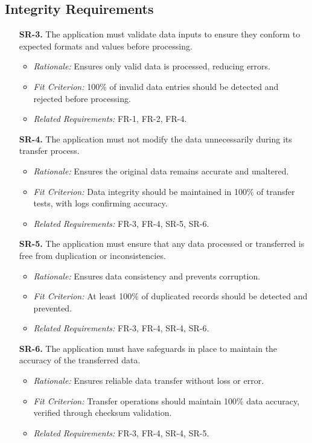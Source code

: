 \documentclass[12pt]{article}
\begin{document}
\subsection{Integrity Requirements}
\begin{enumerate}
  \item[\textbf{SR-3.}] The application must validate data inputs to ensure they 
  conform to expected formats and values before processing.
  \begin{itemize}
    \item \textit{Rationale:} Ensures only valid data is processed, reducing 
    errors.
    \item \textit{Fit Criterion:} 100\% of invalid data entries should 
    be detected and rejected before processing.
    \item \textit{Related Requirements:} FR-1, FR-2, FR-4.
  \end{itemize}

  \item[\textbf{SR-4.}] The application must not modify the data unnecessarily 
  during its transfer process.
  \begin{itemize}
    \item \textit{Rationale:} Ensures the original data remains accurate and 
    unaltered.
    \item \textit{Fit Criterion:} Data integrity should be maintained in 100\% 
    of transfer tests, with logs confirming accuracy.
    \item \textit{Related Requirements:} FR-3, FR-4, SR-5, SR-6.
  \end{itemize}

  \item[\textbf{SR-5.}] The application must ensure that any data processed or 
  transferred is free from duplication or inconsistencies.
  \begin{itemize}
    \item \textit{Rationale:} Ensures data consistency and prevents corruption.
    \item \textit{Fit Criterion:} At least 100\% of duplicated records should be 
    detected and prevented.
    \item \textit{Related Requirements:} FR-3, FR-4, SR-4, SR-6.
  \end{itemize}

  \item[\textbf{SR-6.}] The application must have safeguards in place to 
  maintain the accuracy of the transferred data.
  \begin{itemize}
    \item \textit{Rationale:} Ensures reliable data transfer without loss or 
    error.
    \item \textit{Fit Criterion:} Transfer operations should maintain 100\% 
    data accuracy, verified through checksum validation.
    \item \textit{Related Requirements:} FR-3, FR-4, SR-4, SR-5.
  \end{itemize}
\end{enumerate}
\end{document}
